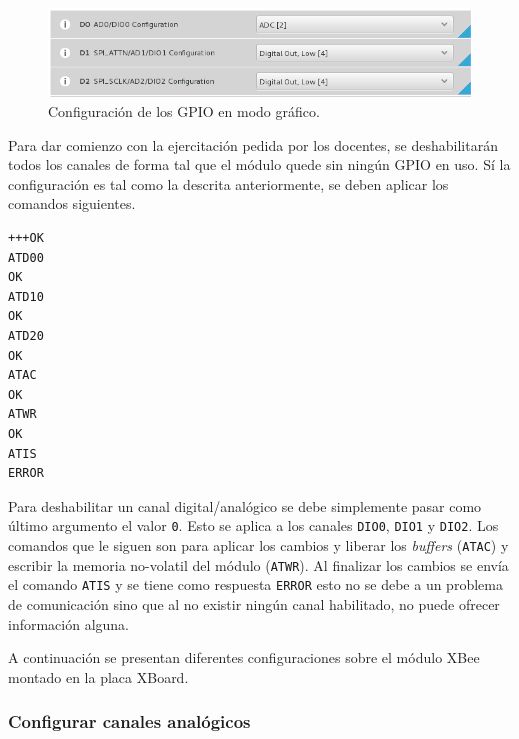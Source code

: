 \documentclass[11pt,oneside,spanish,a4paper]{article}
\begin{document}
\begin{figure}[ht]
  \centering
  \includegraphics[width=.8\textwidth]{img/xctu-atis}
  \caption{Configuración de los GPIO en modo gráfico.}
  \label{fig:xctu-setup}
\end{figure}

Para dar comienzo con la ejercitación pedida por los docentes, se
deshabilitarán todos los canales de forma tal que el módulo quede sin
ningún GPIO en uso. Sí la configuración es tal como la descrita
anteriormente, se deben aplicar los comandos siguientes.

\noindent\begin{minipage}{.25\textwidth}
\begin{lstlisting}[emph={+++,ATIS,ATD00,ATD10,ATD20,ATWR,ATAC}, emphstyle={\color{blue}}]
+++OK
ATD00
OK
ATD10
OK
ATD20
OK
ATAC
OK
ATWR
OK
ATIS
ERROR
\end{lstlisting}
\end{minipage} \hfill
\begin{minipage}{.70\textwidth}
Para deshabilitar un canal digital/analógico se debe simplemente pasar
como último argumento el valor \texttt{0}. Esto se aplica a los
canales \texttt{DIO0}, \texttt{DIO1} y \texttt{DIO2}. Los comandos que
le siguen son para aplicar los cambios y liberar los \textsl{buffers}
(\texttt{ATAC}) y  escribir la
memoria no-volatil del módulo (\texttt{ATWR}). Al finalizar los
cambios se envía el comando \texttt{ATIS} y se tiene como respuesta
\texttt{ERROR} esto no se debe a un problema de comunicación sino que
al no existir ningún canal habilitado, no puede ofrecer información
alguna. 
\end{minipage}

A continuación se presentan diferentes configuraciones sobre el módulo
XBee montado en la placa XBoard.

\subsubsection{Configurar canales analógicos}
\end{document}
